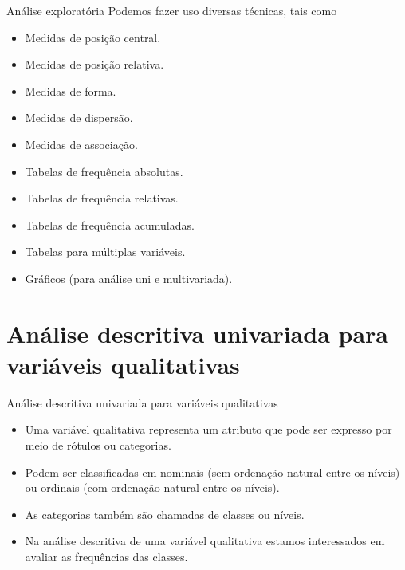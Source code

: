 \documentclass[
  ignorenonframetext,
  serif,
  professionalfont,
  usenames,
  dvipsnames,
  aspectratio = 169]{beamer}
\begin{document}
\begin{frame}{Análise exploratória}
\protect\hypertarget{anuxe1lise-exploratuxf3ria-3}{}
Podemos fazer uso diversas técnicas, tais como

\begin{itemize}
\item
  Medidas de posição central.
\item
  Medidas de posição relativa.
\item
  Medidas de forma.
\item
  Medidas de dispersão.
\item
  Medidas de associação.
\item
  Tabelas de frequência absolutas.
\item
  Tabelas de frequência relativas.
\item
  Tabelas de frequência acumuladas.
\item
  Tabelas para múltiplas variáveis.
\item
  Gráficos (para análise uni e multivariada).
\end{itemize}
\end{frame}

\hypertarget{anuxe1lise-descritiva-univariada-para-variuxe1veis-qualitativas}{%
\section{Análise descritiva univariada para variáveis
qualitativas}\label{anuxe1lise-descritiva-univariada-para-variuxe1veis-qualitativas}}

\begin{frame}{Análise descritiva univariada para variáveis qualitativas}
\protect\hypertarget{anuxe1lise-descritiva-univariada-para-variuxe1veis-qualitativas-1}{}
\begin{itemize}
\item
  Uma variável qualitativa representa um atributo que pode ser expresso
  por meio de rótulos ou categorias.
\item
  Podem ser classificadas em nominais (sem ordenação natural entre os
  níveis) ou ordinais (com ordenação natural entre os níveis).
\item
  As categorias também são chamadas de classes ou níveis.
\item
  Na análise descritiva de uma variável qualitativa estamos interessados
  em avaliar as frequências das classes.
\end{itemize}
\end{frame}
\end{document}
